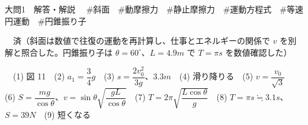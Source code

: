 \documentclass[paper=b5, fontsize=8pt, fleqn, twoside]{jlreq}
\begin{document}
\begin{ascolorbox4A}[75点・30分]{大問1　解答・解説}
　\#斜面　\#動摩擦力　\#静止摩擦力　\#運動方程式　\#等速円運動　\#円錐振り子\par
{}　済（斜面は数値で往復の運動を再計算し、仕事とエネルギーの関係で $v$ を別解と照合した。円錐振り子は $\theta=60^\circ$、$L=4.9\unit{m}$ で $T=\pi\unit{s}$ を数値確認した）\par
{}　(1) 図 11　(2) $a_1=\dfrac{3}{4}g$　(3) $s=\dfrac{2v_0^2}{3g}$、$3.3\unit{m}$　(4) 滑り降りる　(5) $v=\dfrac{v_0}{\sqrt{3}}$　(6) $S=\dfrac{mg}{\cos\theta}$、$v=\sin\theta\sqrt{\dfrac{gL}{\cos\theta}}$　(7) $T=2\pi\sqrt{\dfrac{L\cos\theta}{g}}$　(8) $T=\pi\unit{s}\fallingdotseq3.1\unit{s}$、$S=39\unit{N}$　(9) 短くなる
\end{ascolorbox4A}
\end{document}

